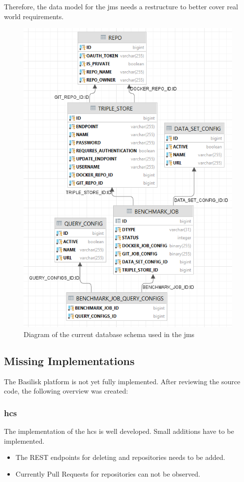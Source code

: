 Therefore, the data model for the \ac{jms} needs a restructure to better cover real world requirements.

\begin{figure}[tbph]
	\centering
	\includegraphics[width=.7\textwidth]{figures/jms_db_schema.png}
	\caption{Diagram of the current database schema used in the \ac{jms}}
	\label{fig:jms_db_schema}
\end{figure}



\subsection{Missing Implementations}
\label{sec:review_missing_impl}
The Basilisk platform is not yet fully implemented.
After reviewing the source code, the following overview was created:

\subsubsection{\acl{hcs}}
The implementation of the \acl{hcs} is well developed.
Small additions have to be implemented.

\begin{itemize}
	\item The REST endpoints for deleting \gh{} and \dockh{} repositories needs to be added.
	
	\item Currently Pull Requests for \gh{} repositories can not be observed.
\end{itemize}


